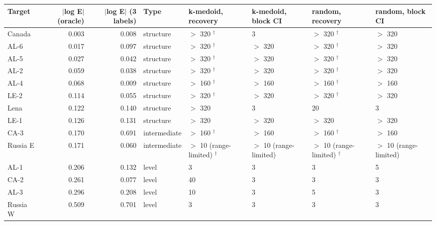 \begin{tabular}{lrrlllll}
\toprule
Target & $|$log E$|$ (oracle) & $|$log E$|$ (3 labels) & Type & k-medoid, recovery & k-medoid, block CI & random, recovery & random, block CI \\
\midrule
Canada & 0.003 & 0.008 & structure & $>$ 320 $^\dagger$ & 3 & $>$ 320 $^\dagger$ & $>$ 320 \\
AL-6 & 0.017 & 0.097 & structure & $>$ 320 $^\dagger$ & $>$ 320 & $>$ 320 $^\dagger$ & $>$ 320 \\
AL-5 & 0.027 & 0.042 & structure & $>$ 320 $^\dagger$ & $>$ 320 & $>$ 320 $^\dagger$ & $>$ 320 \\
AL-2 & 0.059 & 0.038 & structure & $>$ 320 $^\dagger$ & $>$ 320 & $>$ 320 $^\dagger$ & $>$ 320 \\
AL-4 & 0.068 & 0.009 & structure & $>$ 160 $^\dagger$ & $>$ 160 & $>$ 160 $^\dagger$ & $>$ 160 \\
LE-2 & 0.114 & 0.055 & structure & $>$ 320 $^\dagger$ & $>$ 320 & $>$ 320 $^\dagger$ & $>$ 320 \\
Lena & 0.122 & 0.140 & structure & $>$ 320 & 3 & 20 & 3 \\
LE-1 & 0.126 & 0.131 & structure & $>$ 320 & $>$ 320 & $>$ 320 & $>$ 320 \\
CA-3 & 0.170 & 0.691 & intermediate & $>$ 160 $^\dagger$ & $>$ 160 & $>$ 160 $^\dagger$ & $>$ 160 \\
Russia E & 0.171 & 0.060 & intermediate & $>$ 10 (range-limited) $^\dagger$ & $>$ 10 (range-limited) & $>$ 10 (range-limited) $^\dagger$ & $>$ 10 (range-limited) \\
AL-1 & 0.206 & 0.132 & level & 3 & 3 & 3 & 5 \\
CA-2 & 0.261 & 0.077 & level & 40 & 3 & 3 & 3 \\
AL-3 & 0.296 & 0.208 & level & 10 & 3 & 5 & 3 \\
Russia W & 0.509 & 0.701 & level & 3 & 3 & 3 & 3 \\
\bottomrule
\end{tabular}
